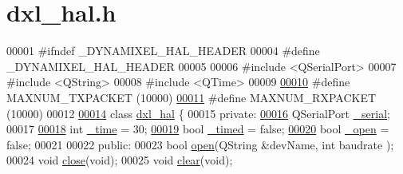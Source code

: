\hypertarget{dxl__hal_8h_source}{}\section{dxl\+\_\+hal.\+h}
\label{dxl__hal_8h_source}

\begin{DoxyCode}
00001 \textcolor{preprocessor}{#ifndef \_DYNAMIXEL\_HAL\_HEADER}
00004 \textcolor{preprocessor}{#define \_DYNAMIXEL\_HAL\_HEADER}
00005 
00006 \textcolor{preprocessor}{#include <QSerialPort>}
00007 \textcolor{preprocessor}{#include <QString>}
00008 \textcolor{preprocessor}{#include <QTime>}
00009 
\hypertarget{dxl__hal_8h_source_l00010}{}\hyperlink{dxl__hal_8h_ad753363487043da5d9fdd3fd1071f59e}{00010} \textcolor{preprocessor}{#define MAXNUM\_TXPACKET  (10000)}
\hypertarget{dxl__hal_8h_source_l00011}{}\hyperlink{dxl__hal_8h_a37d5ce8f0a9ee058fa9674502c6a8b3a}{00011} \textcolor{preprocessor}{#define MAXNUM\_RXPACKET  (10000)}
00012 
\hypertarget{dxl__hal_8h_source_l00014}{}\hyperlink{classdxl__hal}{00014} \textcolor{keyword}{class }\hyperlink{classdxl__hal}{dxl\_hal} \{
00015 \textcolor{keyword}{private}:
\hypertarget{dxl__hal_8h_source_l00016}{}\hyperlink{classdxl__hal_a785d0e35b81d779b54869cad668f9745}{00016}     QSerialPort \hyperlink{classdxl__hal_a785d0e35b81d779b54869cad668f9745}{\_serial};
00017     
\hypertarget{dxl__hal_8h_source_l00018}{}\hyperlink{classdxl__hal_ae3d8733b5ca778b070218765ca0746ac}{00018}     \textcolor{keywordtype}{int} \hyperlink{classdxl__hal_ae3d8733b5ca778b070218765ca0746ac}{\_time} = 30;
\hypertarget{dxl__hal_8h_source_l00019}{}\hyperlink{classdxl__hal_a10d474daa3ca42b5c5ceb6558a955ca1}{00019}     \textcolor{keywordtype}{bool} \hyperlink{classdxl__hal_a10d474daa3ca42b5c5ceb6558a955ca1}{\_timed} = \textcolor{keyword}{false};
\hypertarget{dxl__hal_8h_source_l00020}{}\hyperlink{classdxl__hal_a04831154c43fe4f7499ea0950e0f0999}{00020}     \textcolor{keywordtype}{bool} \hyperlink{classdxl__hal_a04831154c43fe4f7499ea0950e0f0999}{\_open} = \textcolor{keyword}{false};
00021     
00022 \textcolor{keyword}{public}:
00023     \textcolor{keywordtype}{bool} \hyperlink{classdxl__hal_ab631c2a5533125f14db9a8ec1c33aa7c}{open}(QString &devName, \textcolor{keywordtype}{int} baudrate );
00024     \textcolor{keywordtype}{void} \hyperlink{classdxl__hal_a250fd7e4acabf54d0733551a13e89a2d}{close}(\textcolor{keywordtype}{void});
00025     \textcolor{keywordtype}{void} \hyperlink{classdxl__hal_a004eedde5af69219d7288ec8ea97c89f}{clear}(\textcolor{keywordtype}{void});

\end{DoxyCode}
